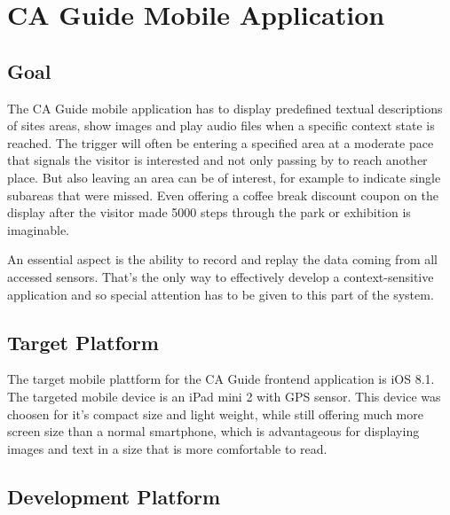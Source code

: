 
\chapter{CA Guide Mobile Application} %

\label{frontend} %



\section{Goal}

The CA Guide mobile application has to display predefined textual descriptions of sites areas, show images and play audio files when a specific context state is reached. The trigger will often be entering a specified area at a moderate pace that signals the visitor is interested and not only passing by to reach another place. But also leaving an area can be of interest, for example to indicate single subareas that were missed. Even offering a coffee break discount coupon on the display after the visitor made 5000 steps through the park or exhibition is imaginable.

An essential aspect is the ability to record and replay the data coming from all accessed sensors. That's the only way to effectively develop a context-sensitive application and so special attention has to be given to this part of the system.

\section{Target Platform}

The target mobile plattform for the CA Guide frontend application is iOS 8.1. The targeted mobile device is an iPad mini 2 with GPS sensor. This device was choosen for it's compact size and light weight, while still offering much more screen size than a normal smartphone, which is advantageous for displaying images and text in a size that is more comfortable to read.

\section{Development Platform}

